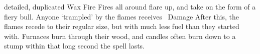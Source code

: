   {detailed, duplicated}%
  {Wax}%
  {Fire}%
  {}%
  {Fires all around flare up, and take on the form of a fiery bull.
  Anyone `trampled' by the flames receives \showDam\ Damage}%
  {After this, the flames recede to their regular size, but with much less fuel than they started with.
  Furnaces burn through their wood, and candles often burn down to a stump within that long second the spell lasts.}


